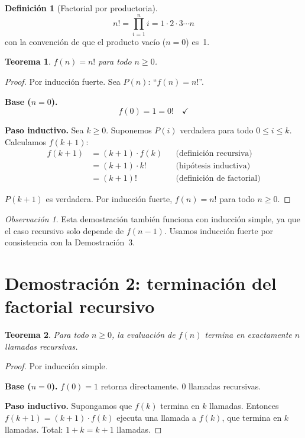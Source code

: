 \documentclass[11pt, letterpaper]{article}
\theoremstyle{definition}
\newtheorem{definition}{Definición}[section]
\theoremstyle{plain}
\newtheorem{theorem}{Teorema}[section]
\theoremstyle{remark}
\newtheorem{remark}{Observación}[section]
\begin{document}
\begin{definition}[Factorial por productoria]
\[
  n! = \prod_{i=1}^{n} i = 1 \cdot 2 \cdot 3 \cdots n
\]
con la convención de que el producto vacío ($n = 0$) es~1.
\end{definition}

\begin{theorem}\label{thm:factorial}
$f(n) = n!$ para todo $n \geq 0$.
\end{theorem}

\begin{proof}
Por inducción fuerte. Sea $P(n)$: ``$f(n) = n!$''.

\textbf{Base ($n = 0$).}
\[
  f(0) = 1 = 0! \quad \checkmark
\]

\textbf{Paso inductivo.} Sea $k \geq 0$. Suponemos $P(i)$ verdadera
para todo $0 \leq i \leq k$. Calculamos $f(k+1)$:
\begin{align*}
  f(k+1) &= (k+1) \cdot f(k)       && \text{(definición recursiva)} \\
         &= (k+1) \cdot k!          && \text{(hipótesis inductiva)} \\
         &= (k+1)!                   && \text{(definición de factorial)}
\end{align*}

$P(k+1)$ es verdadera. Por inducción fuerte, $f(n) = n!$ para todo
$n \geq 0$.
\end{proof}

\begin{remark}
Esta demostración también funciona con inducción simple, ya que el
caso recursivo solo depende de $f(n-1)$. Usamos inducción fuerte por
consistencia con la Demostración~3.
\end{remark}

\section{Demostración 2: terminación del factorial recursivo}

\begin{theorem}\label{thm:termination}
Para todo $n \geq 0$, la evaluación de $f(n)$ termina en exactamente
$n$ llamadas recursivas.
\end{theorem}

\begin{proof}
Por inducción simple.

\textbf{Base ($n = 0$).} $f(0) = 1$ retorna directamente. $0$
llamadas recursivas. \checkmark

\textbf{Paso inductivo.} Supongamos que $f(k)$ termina en $k$
llamadas. Entonces $f(k+1) = (k+1) \cdot f(k)$ ejecuta una llamada
a $f(k)$, que termina en $k$ llamadas. Total: $1 + k = k+1$ llamadas.
\end{proof}
\end{document}
